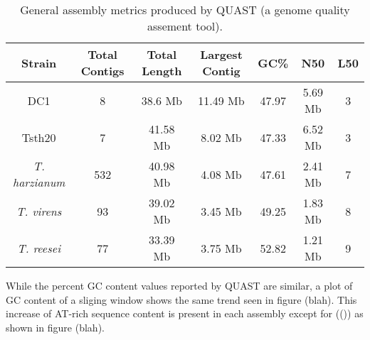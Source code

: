 \begin{table}
  \begin{center}
    \begin{tabular}{|c|c|c|c|c|c|c|}
      \hline
      Strain & Total Contigs & Total Length & Largest Contig & GC\% & N50 & L50 \\ \hline
      DC1 & 8 & 38.6 Mb & 11.49 Mb & 47.97 & 5.69 Mb & 3 \\ \hline
      Tsth20 & 7 & 41.58 Mb & 8.02 Mb & 47.33 & 6.52 Mb & 3 \\ \hline
      \textit{T. harzianum} & 532 & 40.98 Mb & 4.08 Mb & 47.61 & 2.41 Mb & 7 \\ \hline
      \textit{T. virens} & 93 & 39.02 Mb & 3.45 Mb & 49.25 & 1.83 Mb & 8 \\ \hline
      \textit{T. reesei} & 77 & 33.39 Mb & 3.75 Mb & 52.82 & 1.21 Mb & 9 \\ \hline
    \end{tabular}
  \end{center}
  \caption{General assembly metrics produced by QUAST (a
    genome quality assement tool).}
  \label{assemblies}
\end{table}

While the percent GC content values reported by QUAST are similar, a
plot of GC content of a sliging window shows the same trend seen in
figure (blah). This increase of AT-rich sequence content is present in
each assembly except for (()) as shown in figure (blah).
